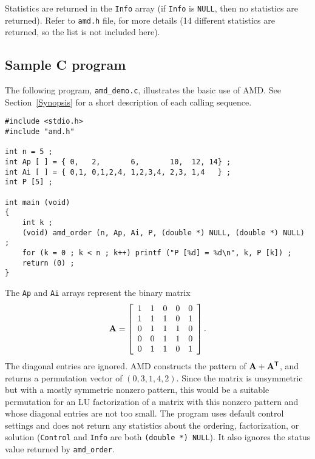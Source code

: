 \documentclass[11pt]{article}
\newcommand{\m}[1]{{\bf{#1}}}       %
\newcommand{\tr}{^{\sf T}}          %
\begin{document}
Statistics are returned in the {\tt Info} array
(if {\tt Info} is {\tt NULL}, then no statistics are returned).
Refer to {\tt amd.h} file, for more details
(14 different statistics are returned, so the list is not included here).

\subsection{Sample C program}

The following program, {\tt amd\_demo.c}, illustrates the basic use of AMD.
See Section~\ref{Synopsis} for a short description
of each calling sequence.

{\footnotesize
\begin{verbatim}
#include <stdio.h>
#include "amd.h"

int n = 5 ;
int Ap [ ] = { 0,   2,       6,       10,  12, 14} ;
int Ai [ ] = { 0,1, 0,1,2,4, 1,2,3,4, 2,3, 1,4   } ;
int P [5] ;

int main (void)
{
    int k ;
    (void) amd_order (n, Ap, Ai, P, (double *) NULL, (double *) NULL) ;
    for (k = 0 ; k < n ; k++) printf ("P [%d] = %d\n", k, P [k]) ;
    return (0) ;
}
\end{verbatim}
}

The {\tt Ap} and {\tt Ai} arrays represent the binary matrix
\[
\m{A} = \left[
\begin{array}{rrrrr}
 1 &  1 &  0 &  0 &  0 \\
 1 &  1 &  1 &  0 &  1 \\
 0 &  1 &  1 &  1 &  0 \\
 0 &  0 &  1 &  1 &  0 \\
 0 &  1 &  1 &  0 &  1 \\
\end{array}
\right].
\]
The diagonal entries are ignored.
%
AMD constructs the pattern of $\m{A}+\m{A}\tr$,
and returns a permutation vector of $(0, 3, 1, 4, 2)$.
%
Since the matrix is unsymmetric but with a mostly symmetric nonzero
pattern, this would be a suitable permutation for an LU factorization of a
matrix with this nonzero pattern and whose diagonal entries are not too small.
The program uses default control settings and does not return any statistics
about the ordering, factorization, or solution ({\tt Control} and {\tt Info}
are both {\tt (double *) NULL}).  It also ignores the status value returned by
{\tt amd\_order}.
\end{document}
